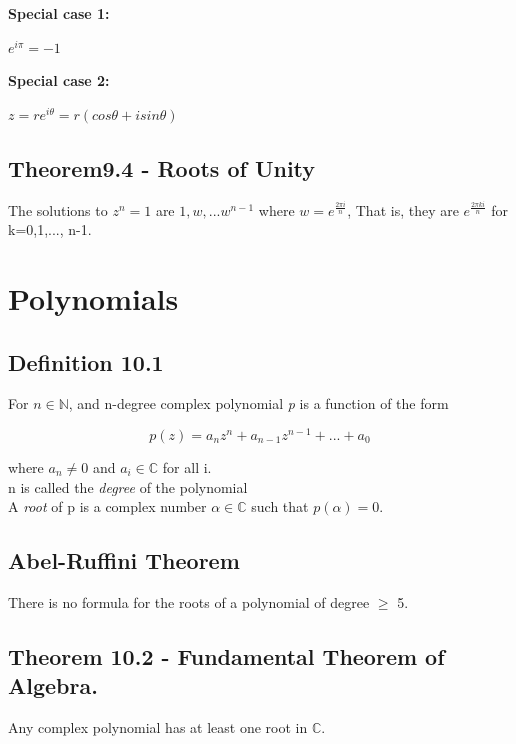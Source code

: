 \documentclass{article}
\theoremstyle{definition}
\theoremstyle{definition}
\theoremstyle{remark}
\begin{document}
\textbf{Special case 1:}\\
\begin{center}
    $e^{i \pi} = -1$
\end{center}

\textbf{Special case 2:}\\
\begin{center}
    $z=re^{i\theta}= r(cos\theta + isin\theta)$
\end{center}

\subsection{Theorem9.4 - Roots of Unity}
The solutions to $z^n = 1$ are $1,w,...w^{n-1}$ where $w=e^{\frac{2\pi i}{n}}$, 
That is, they are $e^{\frac{2\pi k i}{n}}$ for k=0,1,..., n-1.

\newpage
\section{Polynomials}
\subsection{Definition 10.1}
For $n\in \mathbb{N}$, and n-degree complex polynomial \emph{p} is a 
function of the form

\begin{equation}
    p(z)={a}_{n}z^{n} + {a}_{n-1}z^{n-1}+ ... + {a}_{0}
\end{equation}


where ${a}_{n} \neq 0$ and ${a}_{i} \in \mathbb{C}$ for all i.\\
    n is called the \emph{degree} of the polynomial \\
    A \emph{root} of p is a complex number $\alpha \in \mathbb{C}$ 
    such that $p(\alpha) = 0$.\\

\subsection{Abel-Ruffini Theorem}
There is no formula for the roots of a polynomial of degree $\geq$ 5.\\

\subsection{Theorem 10.2 - Fundamental Theorem of Algebra.}
Any complex polynomial has at least one root in $\mathbb{C}$.\\
\end{document}
